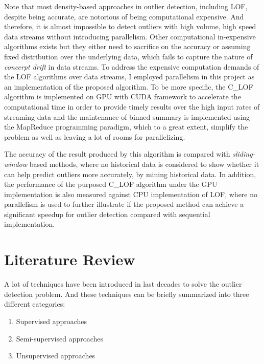 \documentclass[11pt]{article}       %
\begin{document}
Note that most density-based approaches in outlier detection, including LOF, despite being accurate, are notorious of being computational expensive. And therefore, it is almost impossible to detect outliers with high volume, high speed data streams without introducing parallelism. Other computational in-expensive algorithms exists but they either need to sacrifice on the accuracy or assuming fixed distribution over the underlying data, which fails to capture the nature of \textit{concerpt drift} in data streams. To address the expensive computation demands of the LOF algorithms over data streams, I employed parallelism in this project as an implementation of the proposed algorithm. To be more specific, the C\_LOF algorithm is implemented on GPU with CUDA framework to accelerate the computational time in order to provide timely results over the high input rates of streaming data and the maintenance of binned summary is implemented using the MapReduce programming paradigm, which to a great extent, simplify the problem as well as leaving a lot of rooms for parallelizing. 


The accuracy of the result produced by this algorithm is compared with \textit{sliding-window} based methods, where no historical data is considered to show whether it can help predict outliers more accurately, by mining historical data. In addition, the performance of the purposed C\_LOF algorithm under the GPU implementation is also measured against CPU implementation of LOF, where no parallelism is used to further illustrate if the proposed method can achieve a significant speedup for outlier detection compared with sequential implementation.

\section{Literature Review} \label{litrev}

A lot of techniques have been introduced in last decades to solve the outlier detection problem. And these techniques can be briefly summarized into three different categories: 

\begin{enumerate}
  \item Supervised approaches
  \item Semi-supervised approaches
  \item Unsupervised approaches
\end{enumerate}
\end{document}
